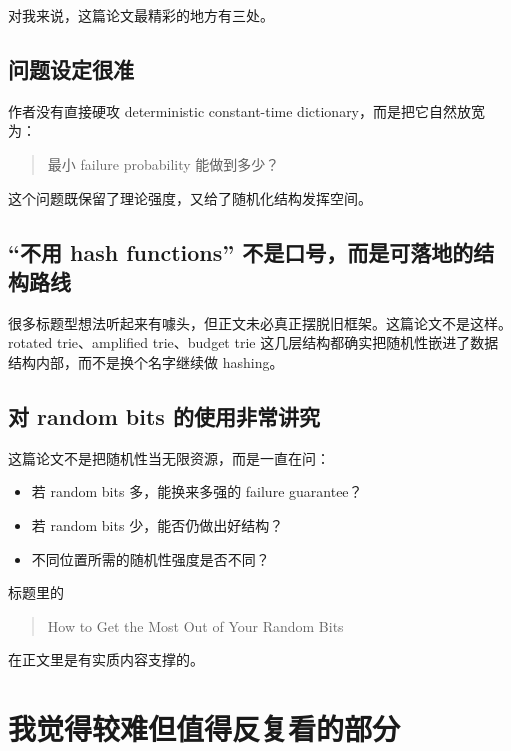 \documentclass[12pt]{article}
\begin{document}
对我来说，这篇论文最精彩的地方有三处。

\subsection{问题设定很准}

作者没有直接硬攻 deterministic constant-time dictionary，而是把它自然放宽为：

\begin{quote}最小 failure probability 能做到多少？\end{quote}

这个问题既保留了理论强度，又给了随机化结构发挥空间。

\subsection{“不用 hash functions” 不是口号，而是可落地的结构路线}

很多标题型想法听起来有噱头，但正文未必真正摆脱旧框架。这篇论文不是这样。rotated trie、amplified trie、budget trie 这几层结构都确实把随机性嵌进了数据结构内部，而不是换个名字继续做 hashing。

\subsection{对 random bits 的使用非常讲究}

这篇论文不是把随机性当无限资源，而是一直在问：

\begin{itemize}

\item 若 random bits 多，能换来多强的 failure guarantee？

\item 若 random bits 少，能否仍做出好结构？

\item 不同位置所需的随机性强度是否不同？

\end{itemize}

标题里的

\begin{quote}How to Get the Most Out of Your Random Bits\end{quote}

在正文里是有实质内容支撑的。

\section{我觉得较难但值得反复看的部分}
\end{document}
